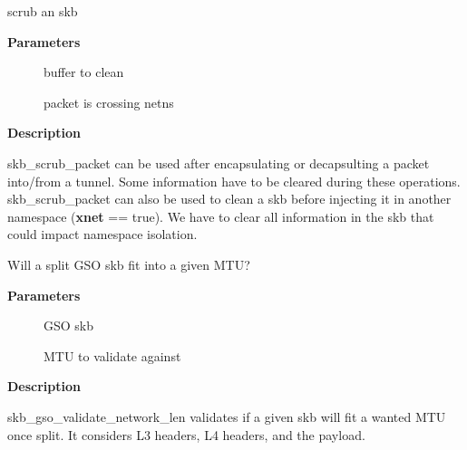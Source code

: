 \documentclass[a4paper,8pt,english]{sphinxmanual}
\begin{document}
\begin{fulllineitems}
\label{networking/kapi:c.skb_scrub_packet}
scrub an skb

\end{fulllineitems}


\textbf{Parameters}
\begin{description}
\item[{}] \leavevmode
buffer to clean

\item[{}] \leavevmode
packet is crossing netns

\end{description}

\textbf{Description}

skb\_scrub\_packet can be used after encapsulating or decapsulting a packet
into/from a tunnel. Some information have to be cleared during these
operations.
skb\_scrub\_packet can also be used to clean a skb before injecting it in
another namespace (\textbf{xnet} == true). We have to clear all information in the
skb that could impact namespace isolation.

\begin{fulllineitems}
\label{networking/kapi:c.skb_gso_validate_network_len}
Will a split GSO skb fit into a given MTU?

\end{fulllineitems}


\textbf{Parameters}
\begin{description}
\item[{}] \leavevmode
GSO skb

\item[{}] \leavevmode
MTU to validate against

\end{description}

\textbf{Description}

skb\_gso\_validate\_network\_len validates if a given skb will fit a
wanted MTU once split. It considers L3 headers, L4 headers, and the
payload.
\end{document}
